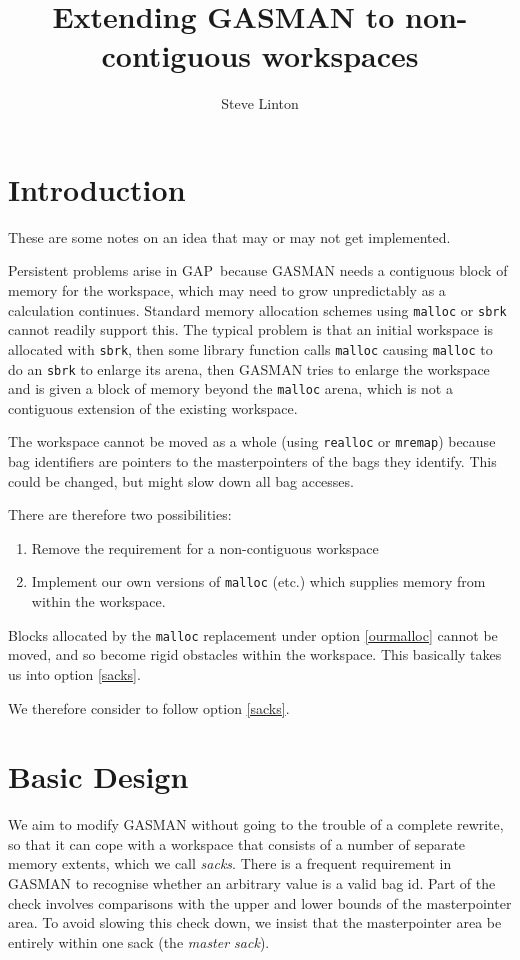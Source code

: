 \documentclass[12pt]{article}
\title{Extending GASMAN to non-contiguous workspaces}
\author{Steve Linton}
\newcommand{\GAP}{\textsf{GAP}}
\begin{document}
\maketitle
\section{Introduction}

These are some notes on an idea that may or may not get implemented.

Persistent problems arise in \GAP\ because GASMAN needs a contiguous
block of memory for the workspace, which may need to grow
unpredictably as a calculation continues. Standard memory allocation
schemes using \verb|malloc| or \verb|sbrk| cannot readily support
this.  The typical problem is that an initial workspace is allocated
with \verb|sbrk|, then some library function calls \verb|malloc|
causing \verb|malloc| to do an \verb|sbrk| to enlarge its arena, then
GASMAN tries to enlarge the workspace and is given a block of memory
beyond the \verb|malloc| arena, which is not a contiguous extension of 
the existing workspace.

The workspace cannot be moved as a whole (using \verb|realloc| or \verb|mremap|)
because bag identifiers are pointers to the masterpointers of the 
bags they identify. This could be changed, but might slow down all bag
accesses.

There are therefore two possibilities:
\begin{enumerate}
\item Remove the requirement for a non-contiguous workspace \label{sacks}
\item Implement our own versions of \verb|malloc| (etc.) which
supplies memory from within the workspace. \label{ourmalloc}
\end{enumerate}

Blocks allocated by the \verb|malloc| replacement under option
\ref{ourmalloc} cannot be moved, and so become rigid obstacles within
the workspace. This basically takes us into option \ref{sacks}.

We therefore consider to follow option \ref{sacks}.

\section{Basic Design}

We aim to modify GASMAN without going to the trouble of a complete
rewrite, so that it can cope with a workspace that consists of a
number of separate memory extents, which we call \emph{sacks}. There
is a frequent requirement in GASMAN to recognise whether an arbitrary
value is a valid bag id. Part of the check involves comparisons with
the upper and lower bounds of the masterpointer area. To avoid slowing 
this check down, we insist that the masterpointer area be entirely
within one sack (the \emph{master sack}).
\end{document}
